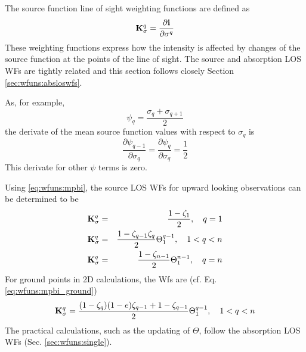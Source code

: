  \label{sec:wfuns:sourceloswfs}

 The source function line of sight weighting functions are defined as
 \begin{equation}
   \mathbf{K}_{\sigma}^q =  \frac{\partial\mathbf{i}}{\partial \sigma^q}
  \label{eq:wfuns:sloswfs}
 \end{equation}
 These weighting functions express how the intensity is affected by
 changes of the source function at the points of the line of sight.
 The source and absorption LOS WFs are tightly related and this
 section follows closely Section \ref{sec:wfuns:absloswfs}.


  \label{sec:wfuns:single2}
  As, for example,
  \begin{equation}
    \psi_{q} = \frac{\sigma_q+\sigma_{q+1}}{2}
  \end{equation}
  the derivate of the mean source function values with respect to 
  $\sigma_q$ is
  \begin{equation}
    \frac{\partial \psi_{q-1}}{\partial \sigma_q} = 
    \frac{\partial \psi_q}{\partial \sigma_q} = \frac{1}{2}
   \label{eq:wfuns:dpsi}
  \end{equation}
  This derivate for other $\psi$ terms is zero.
 
  Using \ref{eq:wfuns:mpbi}, the source LOS WFs for upward looking
  observations can be determined to be
  \begin{eqnarray}
    \mathbf{K}_{\sigma}^q &=& \frac{1-\zeta_1}{2}, \quad q=1 
     \nonumber \\
    \mathbf{K}_{\sigma}^q &=& \frac{1-\zeta_{q-1}\zeta_q}{2} 
                                            \Theta^{q-1}_1, \quad 1<q<n \\
    \mathbf{K}_{\sigma}^q &=& \frac{1-\zeta_{n-1}}{2}\Theta^{n-1}_{1}, \quad q=n
     \nonumber
  \end{eqnarray}
  For ground points in 2D calculations, the Wfs are (cf. Eq. 
  \ref{eq:wfuns:mpbi_ground})
  \begin{equation}
    \mathbf{K}_{\sigma}^q = \frac{(1-\zeta_q)(1-e)\zeta_{q-1}+1-\zeta_{q-1}}{2} 
                                            \Theta^{q-1}_1, \quad 1<q<n \\
  \end{equation}
  The practical calculations, such as the updating of $\Theta$, follow the
  absorption LOS WFs (Sec. \ref{sec:wfuns:single}).


